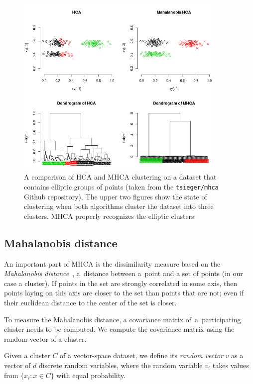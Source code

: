 \begin{figure}[t]\centering
	\includegraphics[width=10cm]{img/mhca}
	\caption{A comparison of HCA and MHCA clustering on a dataset that contains elliptic groups of points (taken from the \texttt{tsieger/mhca} Github repository). The upper two figures show the state of clustering when both algorithms cluster the dataset into three clusters. MHCA properly recognizes the elliptic clusters.}
	\label{fig01:mhca}
\end{figure}

\subsection{Mahalanobis distance}

An important part of MHCA is the dissimilarity measure based on the \emph{Mahalanobis distance}~\cite{mahalanobis1936generalized}, a~distance between a~point and a set of points (in our case a cluster). If points in the set are strongly correlated in some axis, then points laying on this axis are closer to the set than points that are not; even if their euclidean distance to the center of the set is closer.

To measure the Mahalanobis distance, a covariance matrix of~a~participating cluster needs to be computed. We compute the covariance matrix using the random vector of a cluster.

\begin{defn}
	Given a cluster $C$ of a vector-space dataset, we define its \emph{random vector} $v$ as a vector of $d$ discrete random variables, where the random variable $v_i$ takes values from $\{x_i:x\in C\}$ with equal probability.
\end{defn}

